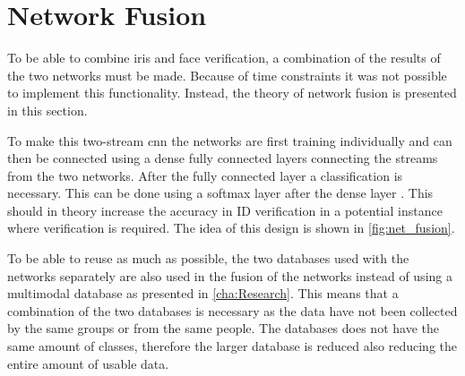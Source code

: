 \section{Network Fusion}
To be able to combine iris and face verification, a combination of the results of the two networks must be made. Because of time constraints it was not possible to implement this functionality. Instead, the theory of network fusion is presented in this section.

To make this two-stream \gls{cnn} the networks are first training individually and can then be connected using a dense fully connected layers connecting the streams from the two networks. After the fully connected layer a classification is necessary. This can be done using a softmax layer after the dense layer \citep{Eitel2015}. This should in theory increase the accuracy in ID verification in a potential instance where verification is required. The idea of this design is shown in \autoref{fig:net_fusion}.

To be able to reuse as much as possible, the two databases used with the networks separately are also used in the fusion of the networks instead of using a multimodal database as presented in \autoref{cha:Research}. 
This means that a combination of the two databases is necessary as the data have not been collected by the same groups or from the same people. The databases does not have the same amount of classes, therefore the larger database is reduced also reducing the entire amount of usable data.